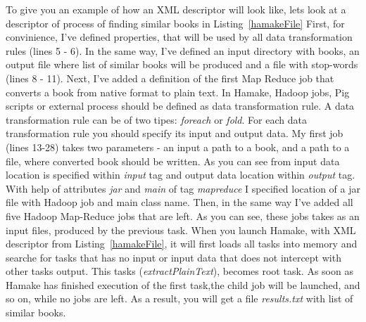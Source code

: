 \documentclass{article}
\begin{document}
To give you an example of how an XML descriptor will look like, lets look at a descriptor of process of finding similar books in Listing~\ref{hamakeFile}
First, for convinience, I've defined properties, that will be used by all data transformation rules (lines 5 - 6). In the same way, I've defined
an input directory with books, an output file where list of similar books will be produced and a file with stop-words (lines 8 - 11).
Next, I've added a definition of the first Map Reduce job that converts a book from native format to plain text. In Hamake, Hadoop jobs, Pig scripts or external process should be
defined as data transformation rule. A data transformation rule can be of two tipes: \textit{foreach} or \textit{fold}. For each data transformation rule you should 
specify its input and output data. My first job (lines 13-28) takes two parameters - an input a path to a book, and a path to a file, where converted book should be written. 
As you can see from input data location is specified within \textit{input} tag and output data location within \textit{output} tag. With help of attributes \textit{jar} and \textit{main} of tag 
\textit{mapreduce} I specified location of a jar file with Hadoop job and main class name. Then, in the same way I've added all five Hadoop Map-Reduce jobs that are left. As you can see, these jobs takes as an input files, produced by the previous task. When you launch Hamake, with XML descriptor from Listing~\ref{hamakeFile}, it will first loads all tasks into memory and searche for tasks that has no input or input data that does not intercept with other tasks output. This tasks (\textit{extractPlainText}), becomes root task. As soon as Hamake has finished execution of the first task,the child job will be launched, and so on, while no jobs are left.
As a result, you will get a file \textit{results.txt} with list of similar books.
\end{document}
